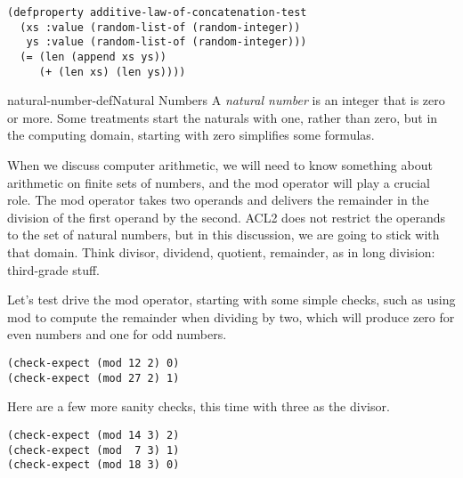 \label{additive-lengths-test}
\begin{code}
\begin{verbatim}
(defproperty additive-law-of-concatenation-test
  (xs :value (random-list-of (random-integer))
   ys :value (random-list-of (random-integer)))
  (= (len (append xs ys))
     (+ (len xs) (len ys))))
\end{verbatim}
\end{code}

\begin{aside}{natural-number-def}{Natural Numbers}
A \emph{natural number} is
an integer that is zero or more.
Some treatments start the naturals with one,
rather than zero, but in the computing domain,
starting with zero simplifies some formulas.
\end{aside}

When we discuss computer arithmetic, we will need to know something about
arithmetic on finite sets of numbers,  and the
\label{mod-function}mod
operator will play a crucial role.
The mod operator takes two operands and
delivers the remainder in the division of the first operand by the second.
ACL2 does not restrict the operands to the set of natural numbers,
but in this discussion, we are going to stick with that domain.
Think
divisor, dividend, quotient, remainder,
as in
long division:
third-grade stuff.

Let's test drive the \textsf{mod} operator, starting with
some simple checks, such as using \textsf{mod}
to compute the remainder when dividing by two,
which will produce zero for even numbers and one for odd numbers.

\begin{code}
\begin{verbatim}
(check-expect (mod 12 2) 0)
(check-expect (mod 27 2) 1)
\end{verbatim}
\end{code}

Here are a few more sanity checks, this time with three as the divisor.

\begin{code}
\begin{verbatim}
(check-expect (mod 14 3) 2)
(check-expect (mod  7 3) 1)
(check-expect (mod 18 3) 0)
\end{verbatim}
\end{code}


